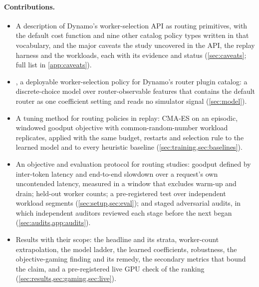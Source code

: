 \paragraph{Contributions.}
\begin{itemize}
  \item A description of Dynamo's worker-selection API as routing primitives, with the default
    cost function and nine other catalog policy types written in that vocabulary, and the major
    caveats the study uncovered in the API, the replay harness and the workloads, each with its
    evidence and status (\cref{sec:caveats}; full list in \cref{app:caveats}).
  \item \lc{}, a deployable worker-selection policy for Dynamo's router plugin catalog: a
    discrete-choice model over router-observable features that contains the default router as one
    coefficient setting and reads no simulator signal (\cref{sec:model}).
  \item A tuning method for routing policies in replay: CMA-ES on an episodic, windowed goodput
    objective with common-random-number workload replicates, applied with the same budget,
    restarts and selection rule to the learned model and to every heuristic baseline
    (\cref{sec:training,sec:baselines}).
  \item An objective and evaluation protocol for routing studies: goodput defined by inter-token
    latency and end-to-end slowdown over a request's own uncontended latency, measured in a window
    that excludes warm-up and drain; held-out worker counts; a pre-registered test over independent
    workload segments (\cref{sec:setup,sec:eval}); and staged adversarial audits, in which
    independent auditors reviewed each stage before the next began (\cref{sec:audits,app:audits}).
  \item Results with their scope: the headline and its strata, worker-count extrapolation, the
    model ladder, the learned coefficients, robustness, the objective-gaming finding and its
    remedy, the secondary metrics that bound the claim, and a pre-registered live GPU check of the
    ranking (\cref{sec:results,sec:gaming,sec:live}).
\end{itemize}


